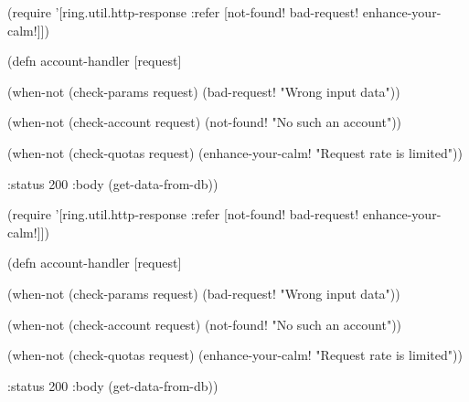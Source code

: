 \else

\iflarge

\begin{english}
  \begin{clojure}
(require '[ring.util.http-response
           :refer [not-found!
                   bad-request!
                   enhance-your-calm!]])

(defn account-handler [request]

  (when-not (check-params request)
    (bad-request! "Wrong input data"))

  (when-not (check-account request)
    (not-found! "No such an account"))
  \end{clojure}
\end{english}

\begin{english}
  \begin{clojure}
  (when-not (check-quotas request)
    (enhance-your-calm! "Request rate is limited"))

  {:status 200
   :body (get-data-from-db)})
  \end{clojure}
\end{english}

\else

\ifafive

\begin{english}
  \begin{clojure}
(require '[ring.util.http-response
           :refer [not-found!
                   bad-request!
                   enhance-your-calm!]])

(defn account-handler [request]

  (when-not (check-params request)
    (bad-request! "Wrong input data"))

  (when-not (check-account request)
    (not-found! "No such an account"))
  \end{clojure}
\end{english}

\vspace{10mm}\pagebreak

\begin{english}
  \begin{clojure}
  (when-not (check-quotas request)
    (enhance-your-calm! "Request rate is limited"))

  {:status 200
   :body (get-data-from-db)})
  \end{clojure}
\end{english}

\else

